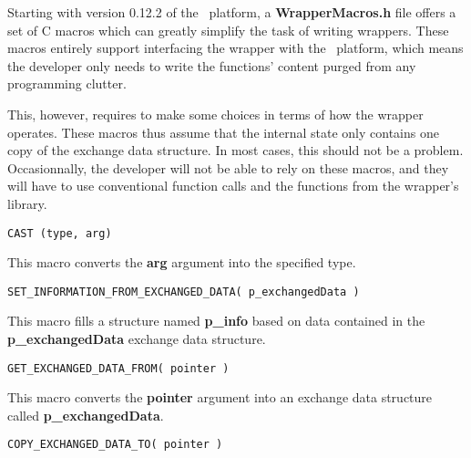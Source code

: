 
Starting with version 0.12.2 of the \OT\ platform, a {\bf WrapperMacros.h} file offers a set of C macros which can greatly simplify the task of writing wrappers. These macros entirely support interfacing the wrapper with the \OT\ platform, which means the developer only needs to write the functions' content purged from any programming clutter.

This, however, requires to make some choices in terms of how the wrapper operates. These macros thus assume that the internal state only contains one copy of the exchange data structure. In most cases, this should not be a problem. Occasionnally, the developer will not be able to rely on these macros, and they will have to use conventional function calls and the functions from the wrapper's library.

\lstset{language=C++, basicstyle=\normalsize}
\begin{lstlisting}[frame=TRBL]
  CAST (type, arg)
\end{lstlisting}

This macro converts the {\bf arg} argument into the specified type.

\lstset{language=C++, basicstyle=\normalsize}
\begin{lstlisting}[frame=TRBL]
  SET_INFORMATION_FROM_EXCHANGED_DATA( p_exchangedData )
\end{lstlisting}

This macro fills a structure named {\bf p\_info} based on data contained in the {\bf p\_exchangedData} exchange data structure.

\lstset{language=C++, basicstyle=\normalsize}
\begin{lstlisting}[frame=TRBL]
  GET_EXCHANGED_DATA_FROM( pointer )
\end{lstlisting}

This macro converts the {\bf pointer} argument into an exchange data structure called {\bf p\_exchangedData}.

\lstset{language=C++, basicstyle=\normalsize}
\begin{lstlisting}[frame=TRBL]
  COPY_EXCHANGED_DATA_TO( pointer )
\end{lstlisting}

